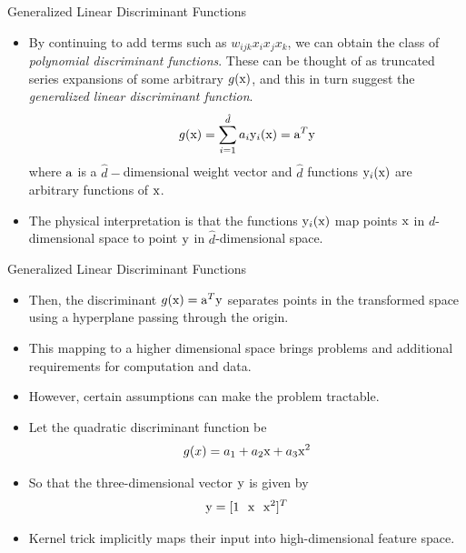 \begin{frame}{Generalized Linear Discriminant Functions}
\begin{itemize}
\item By continuing to add terms such as $w_{ijk}x_ix_jx_k$, we can obtain the class of \textit{\color{mycolor2}polynomial discriminant functions}.
These can be thought of as truncated series expansions of some arbitrary $g ( {\rm x} )$, and this in turn suggest the
\textit{\color{mycolor2}generalized linear discriminant function}.
\begin{equation}
g({\rm x}) = \sum\limits_{i = 1}^{\hat d} {{a_i}{{\rm y}_i}({\rm x}) = {{\rm a}^T}{\rm y}} \nonumber
\end{equation}
where ${\rm a}$ is a $\hat{d}-$dimensional weight vector and $\hat{d}$ functions ${\rm y}_i({\rm x})$ are arbitrary functions of ${\rm x}$.
\item The physical interpretation is that the functions ${\rm y}_i({\rm x})$ map points ${\rm x}$ in $d$-dimensional space to point ${\rm y}$ in $\hat{d}$-dimensional space.
\end{itemize}
\end{frame}

\begin{frame}{Generalized Linear Discriminant Functions}
\begin{itemize}
\item Then, the discriminant $g({\rm x}) = {\rm a}^T {\rm y}$ separates points in the transformed space using a hyperplane passing through the origin.
\item This mapping to a higher dimensional space brings problems and additional requirements for computation and data.
\item However, certain assumptions can make the problem tractable.
\item Let the quadratic discriminant function be
\begin{equation}
g(x)=a_1+a_2{\rm x}+a_3{\rm x}^2 \nonumber
\end{equation}
\item So that the three-dimensional vector ${\rm y}$ is given by
\begin{equation}
{\rm y}=[1~~{\rm x}~~{\rm x}^2]^T \nonumber
\end{equation}
\item {\color{mycolor1}Kernel trick} implicitly maps their input into high-dimensional feature space.
\end{itemize}
\end{frame}

